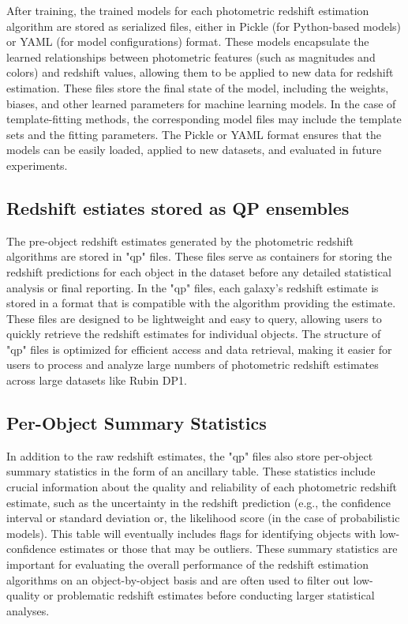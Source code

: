 After training, the trained models for each photometric redshift estimation algorithm are stored as serialized files, either in Pickle (for Python-based models) or YAML (for model configurations) format.  These models encapsulate the learned relationships between photometric features (such as magnitudes and colors) and redshift values, allowing them to be applied to new data for redshift estimation.  These files store the final state of the model, including the weights, biases, and other learned parameters for machine learning models.  In the case of template-fitting methods, the corresponding model files may include the template sets and the fitting parameters.  The Pickle or YAML format ensures that the models can be easily loaded, applied to new datasets, and evaluated in future experiments.


\subsection{Redshift estiates stored as QP ensembles}
\label{sec: products:qp_ensembles}

The pre-object redshift estimates generated by the photometric redshift algorithms are stored in "qp" files.  These files serve as containers for storing the redshift predictions for each object in the dataset before any detailed statistical analysis or final reporting.  In the "qp" files, each galaxy’s redshift estimate is stored in a format that is compatible with the algorithm providing the estimate.  These files are designed to be lightweight and easy to query, allowing users to quickly retrieve the redshift estimates for individual objects.  The structure of "qp" files is optimized for efficient access and data retrieval, making it easier for users to process and analyze large numbers of photometric redshift estimates across large datasets like Rubin DP1.



\subsection{Per-Object Summary Statistics}
\label{sec: products:summary_statistics}

In addition to the raw redshift estimates, the "qp" files also store per-object summary statistics in the form of an ancillary table.  These statistics include crucial information about the quality and reliability of each photometric redshift estimate, such as the uncertainty in the redshift prediction (e.g., the confidence interval or standard deviation or, the likelihood score (in the case of probabilistic models).   This table will eventually includes flags for identifying objects with low-confidence estimates or those that may be outliers.  These summary statistics are important for evaluating the overall performance of the redshift estimation algorithms on an object-by-object basis and are often used to filter out low-quality or problematic redshift estimates before conducting larger statistical analyses.

